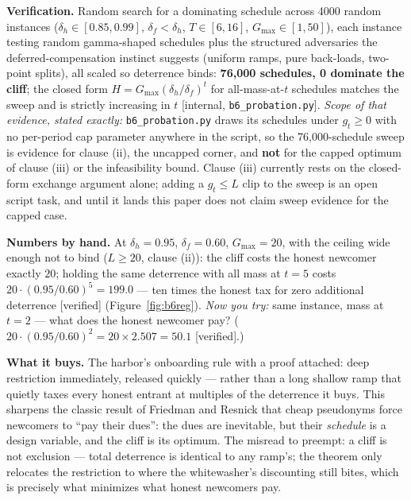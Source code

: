 \documentclass[11pt,a4paper]{article}
\begin{document}
\begin{thebox}
\textbf{Verification.} Random search for a dominating schedule across 4000 random instances
($\delta_h\in[0.85,0.99]$, $\delta_f<\delta_h$, $T\in[6,16]$, $G_{\max}\in[1,50]$), each instance testing random gamma-shaped
schedules plus the structured adversaries the deferred-compensation instinct suggests (uniform ramps, pure back-loads, two-point
splits), all scaled so deterrence binds: \textbf{76{,}000 schedules, 0 dominate the cliff}; the closed form
$H=G_{\max}(\delta_h/\delta_f)^t$ for all-mass-at-$t$ schedules matches the sweep and is strictly increasing in $t$ [internal,
\texttt{b6\_probation.py}]. \emph{Scope of that evidence, stated exactly:} \texttt{b6\_probation.py} draws its schedules under
$g_t\ge0$ with no per-period cap parameter anywhere in the script, so the 76{,}000-schedule sweep is evidence for clause (ii), the
uncapped corner, and \textbf{not} for the capped optimum of clause (iii) or the infeasibility bound. Clause (iii) currently rests on
the closed-form exchange argument alone; adding a $g_t\le L$ clip to the sweep is an open script task, and until it lands this
paper does not claim sweep evidence for the capped case.
\end{thebox}

\textbf{Numbers by hand.} At $\delta_h=0.95$, $\delta_f=0.60$, $G_{\max}=20$, with the ceiling wide enough not to bind ($L\ge20$,
clause (ii)): the cliff costs the honest newcomer exactly $20$;
holding the same deterrence with all mass at $t=5$ costs $20\cdot(0.95/0.60)^5=199.0$ --- ten times the honest tax for zero
additional deterrence [verified] (Figure~\ref{fig:b6reg}). \emph{Now you try:} same instance, mass at $t=2$ --- what does the honest newcomer pay?
($20\cdot(0.95/0.60)^2=20\times 2.507=50.1$ [verified].)



\textbf{What it buys.} The harbor's onboarding rule with a proof attached: deep restriction immediately, released quickly ---
rather than a long shallow ramp that quietly taxes every honest entrant at multiples of the deterrence it buys. This sharpens the
classic result of Friedman and Resnick \cite{friedman-resnick} that cheap pseudonyms force newcomers to ``pay their dues'': the
dues are inevitable, but their \emph{schedule} is a design variable, and the cliff is its optimum. The misread to preempt: a cliff
is not exclusion --- total deterrence is identical to any ramp's; the theorem only relocates the restriction to where the
whitewasher's discounting still bites, which is precisely what minimizes what honest newcomers pay.
\end{document}
